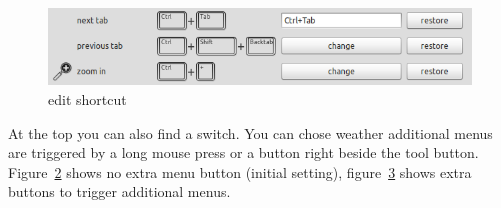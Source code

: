 \documentclass[a4paper,11pt]{report}
\begin{document}
\begin{figure}[H]
\includegraphics[width=\textwidth]{../pictures/editshortcut.png}
\caption{edit shortcut}
\label{pic:editshortcut}
\end{figure}


At the top you can also find a switch. You can chose weather additional menus are triggered by a long mouse press or a button right beside the tool button. Figure~\ref{pic:menusintool} shows no extra menu button (initial setting), figure~\ref{pic:menusbesidetool} shows extra buttons to trigger additional menus.


\begin{minipage}[h]{0.5\textwidth-0.5cm}
\begin{figure}[H]
\label{pic:menusintool}
\end{figure}
\end{minipage}
\hfill
\begin{minipage}[h]{0.5\textwidth-0.5cm}
\begin{figure}[H]
\label{pic:menusbesidetool}
\end{figure}
\end{minipage}
\end{document}
